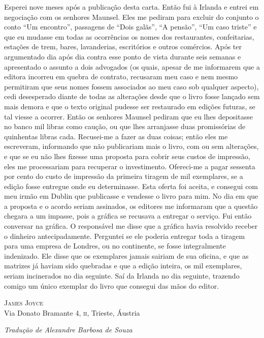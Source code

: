 Esperei nove meses após a publicação desta carta. Então fui à Irlanda e entrei em
negociação com os senhores Maunsel. Eles me pediram para excluir do conjunto o
conto ``Um encontro'', passagens de ``Dois galãs'', ``A pensão'', ``Um caso
triste'' e que eu mudasse em todas as ocorrências os nomes
dos restaurantes, confeitarias, estações de trem, bares, lavanderias,
escritórios e outros comércios. Após ter argumentado dia após dia contra esse
ponto de vista durante seis semanas e apresentado o assunto a dois
advogados (os quais, apesar de me informarem que a editora incorreu em quebra de
contrato, recusaram meu caso e nem mesmo permitiram que seus nomes fossem
associados ao meu caso sob qualquer aspecto), cedi desesperado diante de todas
as alterações desde que o livro fosse lançado sem mais demora e que o texto
original pudesse ser restaurado em edições futuras, se tal viesse a ocorrer.
Então os senhores Maunsel pediram que eu lhes depositasse no banco mil libras
como caução, ou que lhes arranjasse duas promissórias de quinhentas libras cada.
Recusei-me a fazer as duas coisas; então eles me escreveram, informando que não
publicariam mais o livro, com ou sem alterações, e que se eu não lhes fizesse
uma proposta para cobrir seus custos de impressão, eles me processariam para
recuperar o investimento. Ofereci-me a pagar sessenta por cento do custo de
impressão da primeira tiragem de mil exemplares, se a edição fosse entregue onde
eu determinasse. Esta oferta foi aceita, e consegui com meu irmão em Dublin que
publicasse e vendesse o livro para mim. No dia em que a proposta e o acordo
seriam assinados, os editores me informaram que a questão chegara a um impasse,
pois a gráfica se recusava a entregar o serviço. Fui então conversar na gráfica.
O responsável me disse que a gráfica havia resolvido receber o dinheiro
antecipadamente. Perguntei se ele poderia entregar toda a tiragem para uma
empresa de Londres, ou no continente, se fosse integralmente indenizado. Ele
disse que os exemplares jamais sairiam de sua oficina, e que as matrizes já
haviam sido quebradas e que a edição inteira, os mil exemplares, seriam
incinerados no dia seguinte. Saí da Irlanda no dia seguinte, trazendo comigo um
único exemplar do livro que consegui das mãos do editor.

\medskip

{\raggedleft
\textsc{James Joyce}\\
Via Donato Bramante 4, \textsc{ii}, Trieste, Áustria
\par}


\vspace*{30mm}

{\raggedright\itshape
Tradução de Alexandre Barbosa de Souza
\par}
